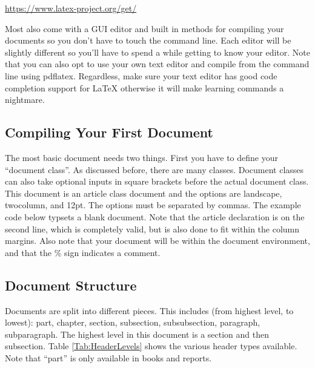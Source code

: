 \begin{center}
	\url{https://www.latex-project.org/get/}
\end{center}

Most also come with a GUI editor and built in methods for compiling your documents so you don't have to touch the command line. Each editor will be slightly different so you'll have to spend a while getting to know your editor. Note that you can also opt to use your own text editor and compile from the command line using pdflatex. Regardless, make sure your text editor has good code completion support for \LaTeX{} otherwise it will make learning commands a nightmare.


\subsection{Compiling Your First Document}

The most basic document needs two things. First you have to define your ``document class''. As discussed before, there are many classes. Document classes can also take optional inputs in square brackets before the actual document class. This document is an article class document and the options are landscape, twocolumn, and 12pt. The options must be separated by commas. The example code below typsets a blank document. Note that the article declaration is on the second line, which is completely valid, but is also done to fit within the column margins. Also note that your document will be within the document environment, and that the \% sign indicates a comment.

\begin{center}
\end{center}

\subsection{Document Structure}

Documents are split into different pieces. This includes (from highest level, to lowest): part, chapter, section, subsection, subsubsection, paragraph, subparagraph. The highest level in this document is a section and then subsection. Table \ref{Tab:HeaderLevels} shows the various header types available. Note that ``part'' is only available in books and reports.

